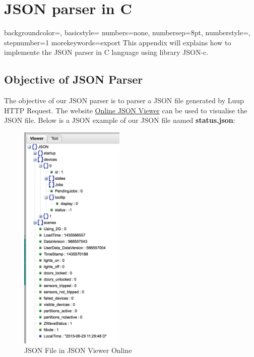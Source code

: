 
\chapter{JSON parser in C} %

\label{AppendixB} %

{
    backgroundcolor=\color{black},
    basicstyle=\scriptsize\color{white}\ttfamily
    numbers=none,
    numbersep=8pt,                   %
    numberstyle=\tiny\color{white}, %
    stepnumber=1                    %
}
{
  morekeywords={export}
}
This appendix will explains how to implemente the JSON parser in C language using library JSON-c.
\section{Objective of JSON Parser}
The objective of our JSON parser is to parser a JSON file generated by Luup HTTP Request. The website \href{http://jsonviewer.stack.hu}{Online JSON Viewer} can be used to visualise the JSON file. Below is a JSON example of our JSON file named \textbf{status.json}:

\begin{figure}[htbp]
	\centering
		\includegraphics[width=5cm]{Figures/jsonviewer.png}
	\caption[JSON File in JSON Viewer Online]{JSON File in JSON Viewer Online}
\end{figure}

